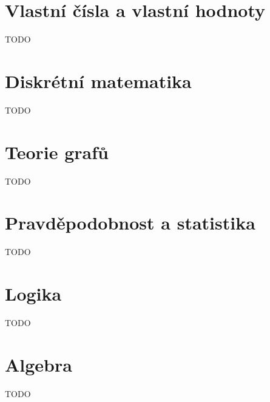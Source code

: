 \section{Vlastní čísla a vlastní hodnoty}
TODO

\section{Diskrétní matematika}
TODO

\section{Teorie grafů}
TODO

\section{Pravděpodobnost a statistika}
TODO

\section{Logika}
TODO

\section{Algebra}
TODO

